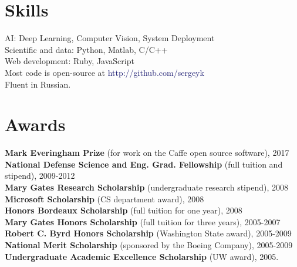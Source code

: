 \documentclass[line, margin]{res}
\begin{document}
\begin{resume}
\section{\sc Skills}
AI: Deep Learning, Computer Vision, System Deployment\\
Scientific and data: Python, Matlab, C/C++\\
Web development: Ruby, JavaScript\\
Most code is open-source at \textcolor{MidnightBlue}{http://github.com/sergeyk}\\
Fluent in Russian.


\section{\sc Awards}
{\bf Mark Everingham Prize} (for work on the Caffe open source software), 2017\\
{\bf National Defense Science and Eng. Grad. Fellowship} (full tuition and stipend), 2009-2012\\
{\bf Mary Gates Research Scholarship} (undergraduate research stipend), 2008\\
{\bf Microsoft Scholarship} (CS department award), 2008\\
{\bf Honors Bordeaux Scholarship} (full tuition for one year), 2008\\
{\bf Mary Gates Honors Scholarship} (full tuition for three years), 2005-2007\\
{\bf Robert C. Byrd Honors Scholarship} (Washington State award), 2005-2009\\
{\bf National Merit Scholarship} (sponsored by the Boeing Company), 2005-2009\\
{\bf Undergraduate Academic Excellence Scholarship} (UW award), 2005.


\end{resume}
\end{document}
